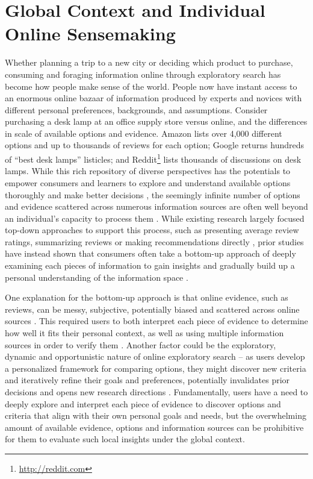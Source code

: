 \section{Global Context and Individual Online Sensemaking}

Whether planning a trip to a new city or deciding which product to purchase, consuming and foraging information online through exploratory search has become how people make sense of the world.  People now have instant access to an enormous online bazaar of information produced by experts and novices with different personal preferences, backgrounds, and assumptions. Consider purchasing a desk lamp at an office supply store versus online, and the differences in scale of available options and evidence. Amazon lists over 4,000 different options and up to thousands of reviews for each option; Google returns hundreds of ``best desk lamps'' listicles; and Reddit\footnote{\url{http://reddit.com}} lists thousands of discussions on desk lamps.  While this rich repository of diverse perspectives has the potentials to empower consumers and learners to explore and understand available options thoroughly and make better decisions \cite{de2015navigating}, the seemingly infinite number of options and evidence scattered across numerous information sources are often well beyond an individual's capacity to process them \cite{simon1971designing}. While existing research largely focused top-down approaches to support this process, such as presenting average review ratings, summarizing reviews \cite{hu2004mining,li2010structure} or making recommendations directly \cite{bobadilla2013recommender}, prior studies have instead shown that consumers often take a bottom-up approach of deeply examining each pieces of information to gain insights and gradually build up a personal understanding of the information space \cite{gan2012helpfulness,mudambi2010research}. 

One explanation for the bottom-up approach is that online evidence, such as reviews, can be messy, subjective, potentially biased and scattered across online sources \cite{hoch1986consumer, racherla2012perceived,zhang2012human,chen2015tripplanner}. This required users to both interpret each piece of evidence to determine how well it fits their personal context, as well as using multiple information sources in order to verify them \cite{Racherla:2012:PUO:2400774.2401599}. Another factor could be the exploratory, dynamic and opportunistic nature of online exploratory search \cite{marchionini2006exploratory} -- as users develop a personalized framework for comparing options, they might discover new criteria and iteratively refine their goals and preferences, potentially invalidates prior decisions and opens new research directions \cite{pirolli1999information,pirolli2005sensemaking}. Fundamentally, users have a need to deeply explore and interpret each piece of evidence to discover options and criteria that align with their own personal goals and needs, but the overwhelming amount of available evidence, options and information sources can be prohibitive for them to evaluate such local insights under the global context.

